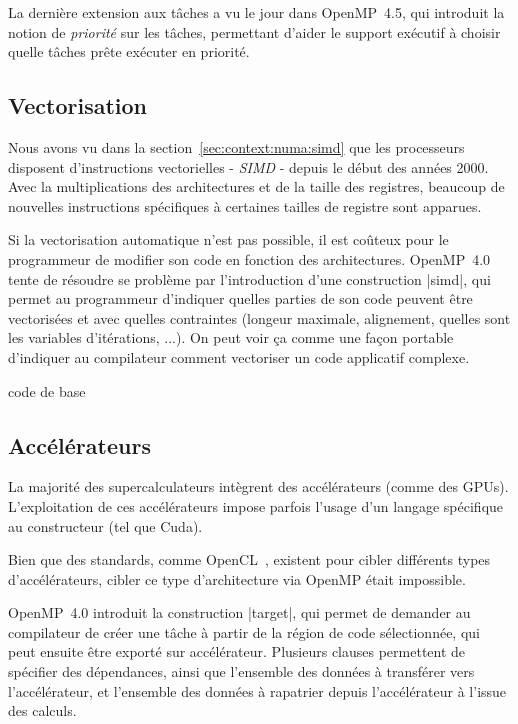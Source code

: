 La dernière extension aux tâches a vu le jour dans OpenMP~4.5, qui introduit la notion de \emph{priorité} sur les tâches, permettant d'aider le support exécutif à choisir quelle tâches prête exécuter en priorité.

\subsection{Vectorisation}

Nous avons vu dans la section~\ref{sec:context:numa:simd} que les processeurs disposent d'instructions vectorielles - \emph{SIMD} - depuis le début des années 2000.
Avec la multiplications des architectures et de la taille des registres, beaucoup de nouvelles instructions spécifiques à certaines tailles de registre sont apparues.

Si la vectorisation automatique n'est pas possible, il est coûteux pour le programmeur de modifier son code en fonction des architectures.
OpenMP~4.0 tente de résoudre se problème par l'introduction d'une construction |simd|, qui permet au programmeur d'indiquer quelles parties de son code peuvent être vectorisées et avec quelles contraintes (longeur maximale, alignement, quelles sont les variables d'itérations, ...).
On peut voir ça comme une façon portable d'indiquer au compilateur comment vectoriser un code applicatif complexe.

\begin{todo}
  code de base
\end{todo}



\subsection{Accélérateurs}

La majorité des supercalculateurs intègrent des accélérateurs (comme des GPUs).
L'exploitation de ces accélérateurs impose parfois l'usage d'un langage spécifique au constructeur (tel que Cuda).

Bien que des standards, comme OpenCL~\cite{Stone2010}, existent pour cibler différents types d'accélérateurs, cibler ce type d'architecture via OpenMP était impossible.

OpenMP~4.0 introduit la construction |target|, qui permet de demander au compilateur de créer une tâche à partir de la région de code sélectionnée, qui peut ensuite être exporté sur accélérateur.
Plusieurs clauses permettent de spécifier des dépendances, ainsi que l'ensemble des données à transférer vers l'accélérateur, et l'ensemble des données à rapatrier depuis l'accélérateur à l'issue des calculs.

